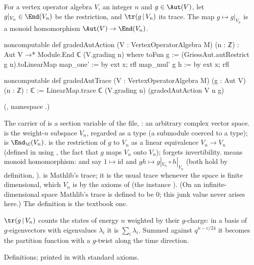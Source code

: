 \begin{definition}\label{ch16:def:gradedtrace}
For a vertex operator algebra $V$, an integer $n$ and $g\in\Aut(V)$, let $g|_{V_n}\in\End(V_n)$ be the restriction,
and $\tr(g\,|\,V_n)$ its trace.  The map $g\mapsto g|_{V_n}$ is a monoid homomorphism $\Aut(V)\to\End(V_n)$.
\end{definition}
\begin{leancode}
noncomputable def gradedAutAction (V : VertexOperatorAlgebra M) (n : ℤ) :
    Aut V →* Module.End ℂ (V.grading n) where
  toFun g := (GriessAut.autRestrict g n).toLinearMap
  map_one' := by ext x; rfl
  map_mul' g h := by ext x; rfl

noncomputable def gradedAutTrace (V : VertexOperatorAlgebra M) (g : Aut V) (n : ℤ) : ℂ :=
  LinearMap.trace ℂ (V.grading n) (gradedAutAction V n g)
\end{leancode}
(, namespace .)
\begin{dictionary}
The carrier  of  is a section variable of the file, :
an arbitrary complex vector space.   is the weight-$n$ subspace $V_n$, regarded as a type (a
submodule coerced to a type);
 is $\End_\C(V_n)$.   is the restriction of $g$ to
$V_n$ as a linear equivalence $V_n\to V_n$ (defined in  using
, the fact that $g$ maps $V_n$ onto $V_n$);  forgets invertibility.
 means monoid homomorphism:  and  say $1\mapsto\mathrm{id}$ and
$gh\mapsto g|_{V_n}\circ h|_{V_n}$ (both hold by definition, ).   is
Mathlib's trace; it is the usual trace whenever the space is finite dimensional, which $V_n$ is by the axioms of
 (the instance ).  (On an infinite-dimensional space Mathlib's trace is
defined to be $0$; this junk value never arises here.)  The definition is the textbook one.
\end{dictionary}
\begin{physics}
$\tr(g\,|\,V_n)$ counts the states of energy $n$ weighted by their $g$-charge: in a basis of $g$-eigenvectors with
eigenvalues $\lambda_i$ it is $\sum_i\lambda_i$.  Summed against $q^{n-c/24}$ it becomes the partition function with
a $g$-twist along the time direction.
\end{physics}
\begin{status}
Definitions; printed in  with standard axioms.
\end{status}

